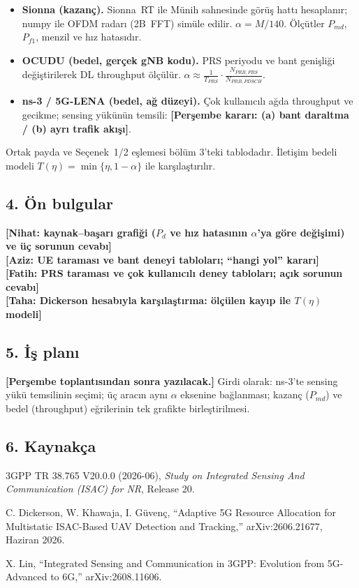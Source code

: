 \documentclass[10.5pt,a4paper]{article}
\begin{document}
\begin{itemize}[leftmargin=1.4em]
\item \textbf{Sionna (kazanç).} Sionna~RT ile Münih sahnesinde görüş hattı hesaplanır; numpy ile OFDM radarı (2B~FFT) simüle edilir. $\alpha=M/140$. Ölçütler $P_{md}$, $P_{f1}$, menzil ve hız hatasıdır.
\item \textbf{OCUDU (bedel, gerçek gNB kodu).} PRS periyodu ve bant genişliği değiştirilerek DL throughput ölçülür. $\alpha\approx\tfrac{1}{T_{PRS}}\cdot\tfrac{N_{PRB,PRS}}{N_{PRB,PDSCH}}$.
\item \textbf{ns-3 / 5G-LENA (bedel, ağ düzeyi).} Çok kullanıcılı ağda throughput ve gecikme; sensing yükünün temsili: \textbf{[Perşembe kararı: (a) bant daraltma / (b) ayrı trafik akışı]}.
\end{itemize}
Ortak payda ve Seçenek~1/2 eşlemesi bölüm 3'teki tablodadır. İletişim bedeli modeli $T(\eta)=\min\{\eta,1-\alpha\}$ ile karşılaştırılır.

\subsection*{4. Ön bulgular}
\textbf{[Nihat: kaynak--başarı grafiği ($P_d$ ve hız hatasının $\alpha$'ya göre değişimi) ve üç sorunun cevabı]}\\
\textbf{[Aziz: UE taraması ve bant deneyi tabloları; ``hangi yol'' kararı]}\\
\textbf{[Fatih: PRS taraması ve çok kullanıcılı deney tabloları; açık sorunun cevabı]}\\
\textbf{[Taha: Dickerson hesabıyla karşılaştırma: ölçülen kayıp ile $T(\eta)$ modeli]}

\subsection*{5. İş planı}
\textbf{[Perşembe toplantısından sonra yazılacak.]} Girdi olarak: ns-3'te sensing yükü temsilinin seçimi; üç aracın aynı $\alpha$ eksenine bağlanması; kazanç ($P_{md}$) ve bedel (throughput) eğrilerinin tek grafikte birleştirilmesi.

\subsection*{6. Kaynakça}
\begin{enumerate}[leftmargin=1.6em,label={[\arabic*]}]
\item 3GPP TR 38.765 V20.0.0 (2026-06), \emph{Study on Integrated Sensing And Communication (ISAC) for NR}, Release 20.
\item C. Dickerson, W. Khawaja, I. Güvenç, ``Adaptive 5G Resource Allocation for Multistatic ISAC-Based UAV Detection and Tracking,'' arXiv:2606.21677, Haziran 2026.
\item X. Lin, ``Integrated Sensing and Communication in 3GPP: Evolution from 5G-Advanced to 6G,'' arXiv:2608.11606.
\end{enumerate}
\end{document}
